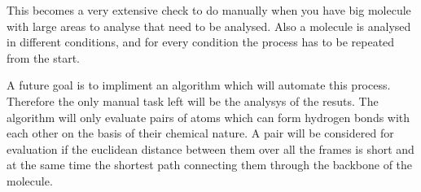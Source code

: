 \documentclass[11pt,twocolumn]{article}
\begin{document}
This becomes a very extensive check to do manually when you have big molecule with large areas to analyse that need to be analysed. Also a molecule is analysed in different conditions, and for every condition the process has to be repeated from the start. 

A future goal is to impliment an algorithm which will automate this process. Therefore the only manual task left will be the analysys of the resuts. The algorithm will only evaluate pairs of atoms which can form hydrogen bonds with each other on the basis of their chemical nature. A pair will be considered for evaluation if the euclidean distance between them over all the frames is short and at the same time the shortest path connecting them through the backbone of the molecule. 





\end{document}
